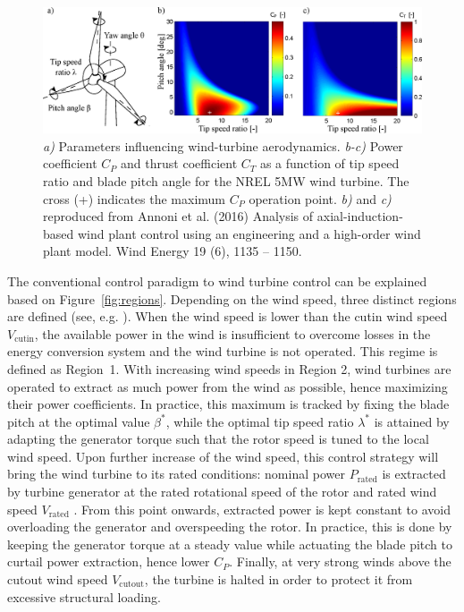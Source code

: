 \begin{figure}[t]
	\centering
	\includegraphics[width=\textwidth]{chapters/introduction/wt_drawing3.eps}
	\caption[Parameters influencing wind-turbine aerodynamics; Power coefficient $C_P$ and thrust coefficient $C_T$ as a function of tip speed ratio and blade pitch angle for the NREL 5MW wind turbine.]{\emph{a)} Parameters influencing wind-turbine aerodynamics. \emph{b-c)} Power coefficient $C_P$ and thrust coefficient $C_T$ as a function of tip speed ratio and blade pitch angle for the NREL 5MW wind turbine. The cross (+) indicates the maximum $C_P$ operation point. \emph{b)} and \emph{c)} reproduced from Annoni et al. (2016) Analysis of axial-induction-based wind plant control using an engineering and a high-order wind plant model. Wind Energy 19 (6), 1135 -- 1150. \label{fig:WT_drawing}}
\end{figure}

The conventional control paradigm to wind turbine control can be explained based on Figure~\ref{fig:regions}. Depending on the wind speed, three distinct regions are defined (see, e.g. \citealp{johnson2006control,laks2009control,pao2009tutorial}). When the wind speed is lower than the cutin wind speed $V_{\text{cutin}}$, the available power in the wind is insufficient to overcome losses in the energy conversion system and the wind turbine is not operated. This regime is defined as Region~1. With increasing wind speeds in Region 2, wind turbines are operated to extract as much power from the wind as possible, hence maximizing their power coefficients. In practice, this maximum is tracked by fixing the blade pitch at the optimal value $\beta^*$, while the optimal tip speed ratio $\lambda^*$ is attained by adapting the generator torque such that the rotor speed is tuned to the local wind speed. Upon further increase of the wind speed, this control strategy will bring the wind turbine to its rated conditions: nominal power $P_{\text{rated}}$ is extracted by turbine generator at the rated rotational speed of the rotor and rated wind speed $V_{\text{rated}}$ . From this point onwards, extracted power is kept constant to avoid overloading the generator and overspeeding the rotor. In practice, this is done by keeping the generator torque at a steady value while actuating the blade pitch to curtail power extraction, hence lower $C_P$. Finally, at very strong winds above the cutout wind speed $V_\text{cutout}$, the turbine is halted in order to protect it from excessive structural loading. 

